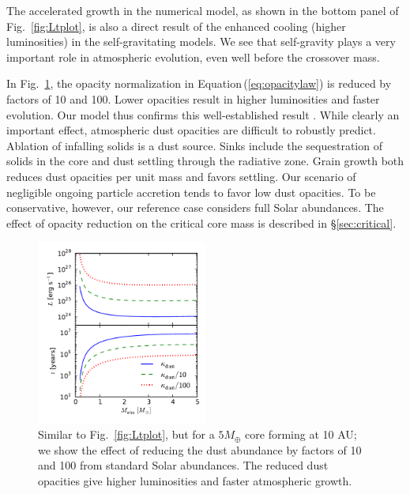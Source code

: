 \documentclass[apj, numberedappendix]{emulateapj}
\newcommand{\Eq}[1]{Equation\,(\ref{#1})}
\newcommand{\Fig}[1]{Fig.~\ref{#1}}
\begin{document}
The accelerated growth in the numerical model, as shown in the bottom panel of \Fig{fig:Ltplot}, is also a direct result of the enhanced cooling (higher luminosities) in the self-gravitating models.  We see that self-gravity plays a very important role in atmospheric evolution, even well before the crossover mass.
 


In \Fig{fig:LtvsMopacity}, the opacity normalization in \Eq{eq:opacitylaw} is reduced by factors of 10 and 100.  Lower opacities result in higher luminosities and faster evolution.  Our model thus confirms this well-established result \citep{HubBod05}.  While clearly an important effect, atmospheric dust opacities are difficult to robustly predict. Ablation of infalling solids is a dust source.  Sinks include the sequestration of solids in the core and dust settling through the radiative zone.  Grain growth both reduces dust opacities per unit mass and favors settling.  Our scenario of negligible ongoing particle accretion tends to favor low dust opacities.   To be conservative, however, our reference case considers full Solar abundances. The effect of opacity reduction on the critical core mass is described in \S\ref{sec:critical}. 

\begin{figure}[tb]
\centering
\includegraphics[width=0.5\textwidth]{../../figs/ModelAtmospheres/RadSelfGravPoly/PaperFigs/opacity_effect.pdf}
\caption{Similar to \Fig{fig:Ltplot}, but for a $5 M_{\oplus}$ core forming at 10 AU; we show the effect of reducing the dust abundance by factors of 10 and 100 from standard Solar abundances. The reduced dust opacities give higher luminosities and faster atmospheric growth.}  %
\label{fig:LtvsMopacity}
\end{figure}
\end{document}
